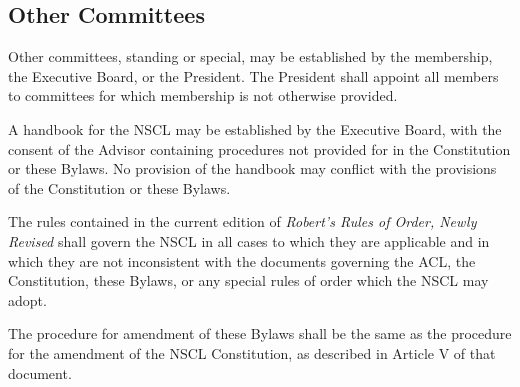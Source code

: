 \documentclass{bylaws}
\newcommand{\NSCL}{\textsc{NSCL}\xspace}
\newcommand{\ACL}{\textsc{ACL}\xspace}
\begin{document}
\begin{linenumbers}[1]
  \section{Other Committees}
  Other committees, standing or special, may be established by the
  membership, the Executive Board, or the President. The President shall
  appoint all members to committees for which membership is not
  otherwise provided.\\

  \pagebreak

  A handbook for the \NSCL may be established by the Executive Board,
  with the consent of the Advisor containing procedures not provided for
  in the Constitution or these Bylaws. No provision of the handbook may
  conflict with the provisions of the Constitution or these Bylaws.\\

  
  The rules contained in the current edition of \textit{Robert's Rules
    of Order, Newly Revised} shall govern the \NSCL in all cases to
  which they are applicable and in which they are not inconsistent with
  the documents governing the \ACL, the Constitution, these Bylaws, or
  any special rules of order which the \NSCL may adopt.\\

  
  The procedure for amendment of these Bylaws shall be the same as the
  procedure for the amendment of the \NSCL Constitution, as described in
  Article V of that document.
  
\end{linenumbers}
\end{document}
